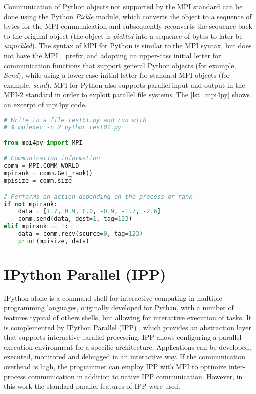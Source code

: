 Communication of Python objects not supported by the MPI standard can be done using the Python \textit {Pickle} module, which converts the object to a sequence of bytes for the MPI communication and subsequently reconverts the sequence back to the original object (the object is \textit {pickled} into a sequence of bytes to later be \textit {unpickled}). 
The syntax of MPI for Python is similar to the MPI syntax, but does not have the MPI\_ prefix, and adopting an upper-case initial letter for communication functions that support general Python objects (for example, \textit {Send}), while using a lower case initial letter for standard MPI objects (for example, \textit {send}). MPI for Python also supports parallel input and output in the MPI-2 standard in order to exploit parallel file systems. The \autoref {lst_mpi4py} shows an excerpt of mpi4py code.

\begin{lstlisting}[float=htb, language={Python}, label={lst_mpi4py}, caption={Excerpt of mpi4py code.}]
# Write to a file test01.py and run with
# $ mpiexec -n 2 python test01.py

from mpi4py import MPI

# Communication information
comm = MPI.COMM_WORLD
mpirank = comm.Get_rank()
mpisize = comm.size

# Performs an action depending on the process or rank
if not mpirank:
    data = [1.7, 0.9, 0.0, -0.9, -1.7, -2.6]
    comm.send(data, dest=1, tag=123)
elif mpirank == 1:
    data = comm.recv(source=0, tag=123)
    print(mpisize, data)
\end{lstlisting}

%
%
%
\section{IPython Parallel (IPP)}
\label{sec_appripyt}

IPython alone is a command shell for interactive computing in multiple programming languages, originally developed for Python, with a number of features typical of others shells, but allowing for interactive execution of tasks. It is complemented by IPython Parallel (IPP) \cite {Limprasert2015}, which provides an abstraction layer that supports interactive parallel processing. IPP allows configuring a parallel execution environment for a specific architecture. Applications can be developed, executed, monitored and debugged in an interactive way. If the communication overhead is high, the programmer can employ IPP with MPI to optimize inter-process communication in addition to native IPP communication. However, in this work the standard parallel features of IPP were used.

